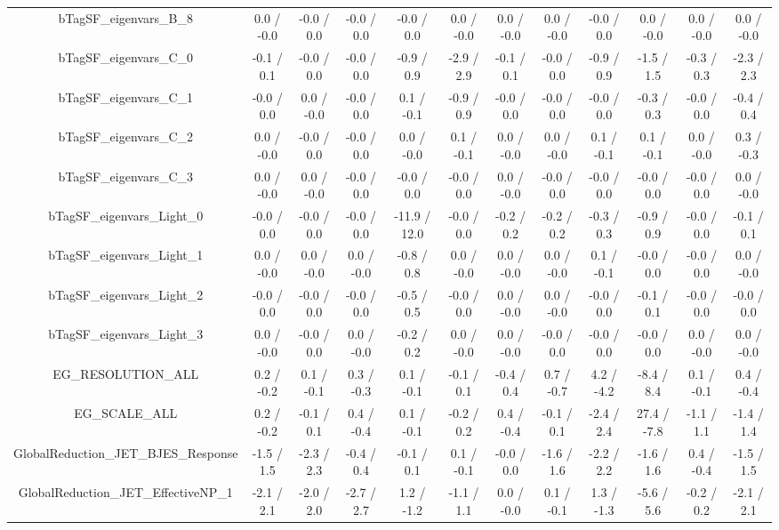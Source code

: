 \begin{table}[htbp]
\begin{center}
\begin{tabular}{|c|c|c|c|c|c|c|c|c|c|c|c|}
  bTagSF_eigenvars_B_8 & 0.0 / -0.0 & -0.0 / 0.0 & -0.0 / 0.0 & -0.0 / 0.0 & 0.0 / -0.0 & 0.0 / -0.0 & 0.0 / -0.0 & -0.0 / 0.0 & 0.0 / -0.0 & 0.0 / -0.0 & 0.0 / -0.0 \\ 
  bTagSF_eigenvars_C_0 & -0.1 / 0.1 & -0.0 / 0.0 & -0.0 / 0.0 & -0.9 / 0.9 & -2.9 / 2.9 & -0.1 / 0.1 & -0.0 / 0.0 & -0.9 / 0.9 & -1.5 / 1.5 & -0.3 / 0.3 & -2.3 / 2.3 \\ 
  bTagSF_eigenvars_C_1 & -0.0 / 0.0 & 0.0 / -0.0 & -0.0 / 0.0 & 0.1 / -0.1 & -0.9 / 0.9 & -0.0 / 0.0 & -0.0 / 0.0 & -0.0 / 0.0 & -0.3 / 0.3 & -0.0 / 0.0 & -0.4 / 0.4 \\ 
  bTagSF_eigenvars_C_2 & 0.0 / -0.0 & -0.0 / 0.0 & -0.0 / 0.0 & 0.0 / -0.0 & 0.1 / -0.1 & 0.0 / -0.0 & 0.0 / -0.0 & 0.1 / -0.1 & 0.1 / -0.1 & 0.0 / -0.0 & 0.3 / -0.3 \\ 
  bTagSF_eigenvars_C_3 & 0.0 / -0.0 & 0.0 / -0.0 & -0.0 / 0.0 & -0.0 / 0.0 & -0.0 / 0.0 & 0.0 / -0.0 & -0.0 / 0.0 & -0.0 / 0.0 & -0.0 / 0.0 & -0.0 / 0.0 & 0.0 / -0.0 \\ 
  bTagSF_eigenvars_Light_0 & -0.0 / 0.0 & -0.0 / 0.0 & -0.0 / 0.0 & -11.9 / 12.0 & -0.0 / 0.0 & -0.2 / 0.2 & -0.2 / 0.2 & -0.3 / 0.3 & -0.9 / 0.9 & -0.0 / 0.0 & -0.1 / 0.1 \\ 
  bTagSF_eigenvars_Light_1 & 0.0 / -0.0 & 0.0 / -0.0 & 0.0 / -0.0 & -0.8 / 0.8 & 0.0 / -0.0 & 0.0 / -0.0 & 0.0 / -0.0 & 0.1 / -0.1 & -0.0 / 0.0 & -0.0 / 0.0 & 0.0 / -0.0 \\ 
  bTagSF_eigenvars_Light_2 & -0.0 / 0.0 & -0.0 / 0.0 & -0.0 / 0.0 & -0.5 / 0.5 & -0.0 / 0.0 & 0.0 / -0.0 & 0.0 / -0.0 & -0.0 / 0.0 & -0.1 / 0.1 & -0.0 / 0.0 & -0.0 / 0.0 \\ 
  bTagSF_eigenvars_Light_3 & 0.0 / -0.0 & -0.0 / 0.0 & 0.0 / -0.0 & -0.2 / 0.2 & 0.0 / -0.0 & 0.0 / -0.0 & -0.0 / 0.0 & -0.0 / 0.0 & -0.0 / 0.0 & 0.0 / -0.0 & 0.0 / -0.0 \\ 
  EG_RESOLUTION_ALL & 0.2 / -0.2 & 0.1 / -0.1 & 0.3 / -0.3 & 0.1 / -0.1 & -0.1 / 0.1 & -0.4 / 0.4 & 0.7 / -0.7 & 4.2 / -4.2 & -8.4 / 8.4 & 0.1 / -0.1 & 0.4 / -0.4 \\ 
  EG_SCALE_ALL & 0.2 / -0.2 & -0.1 / 0.1 & 0.4 / -0.4 & 0.1 / -0.1 & -0.2 / 0.2 & 0.4 / -0.4 & -0.1 / 0.1 & -2.4 / 2.4 & 27.4 / -7.8 & -1.1 / 1.1 & -1.4 / 1.4 \\ 
  GlobalReduction_JET_BJES_Response & -1.5 / 1.5 & -2.3 / 2.3 & -0.4 / 0.4 & -0.1 / 0.1 & 0.1 / -0.1 & -0.0 / 0.0 & -1.6 / 1.6 & -2.2 / 2.2 & -1.6 / 1.6 & 0.4 / -0.4 & -1.5 / 1.5 \\ 
  GlobalReduction_JET_EffectiveNP_1 & -2.1 / 2.1 & -2.0 / 2.0 & -2.7 / 2.7 & 1.2 / -1.2 & -1.1 / 1.1 & 0.0 / -0.0 & 0.1 / -0.1 & 1.3 / -1.3 & -5.6 / 5.6 & -0.2 / 0.2 & -2.1 / 2.1 \\ 

\end{tabular}
\end{center}
\end{table}
